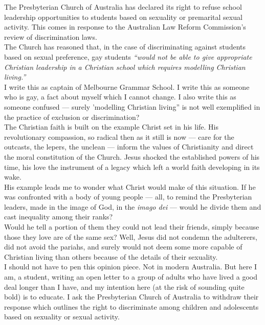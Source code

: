\documentclass[a4paper]{article}
\begin{document}
The Presbyterian Church of Australia has declared its right to refuse school leadership opportunities to students based on sexuality or premarital sexual activity. This comes in response to the Australian Law Reform Commission’s review of discrimination laws.\\

The Church has reasoned that, in the case of discriminating against students based on sexual preference, gay students \textit{``would not be able to give appropriate Christian leadership in a Christian school which requires modelling Christian living.''}\\

I write this as captain of Melbourne Grammar School. I write this as someone who is gay, a fact about myself which I cannot change. I also write this as someone confused — surely 'modelling Christian living” is not well exemplified in the practice of exclusion or discrimination?\\

The Christian faith is built on the example Christ set in his life. His revolutionary compassion, so radical then as it still is now — care for the outcasts, the lepers, the unclean — inform the values of Christianity and direct the moral constitution of the Church. Jesus shocked the established powers of his time, his love the instrument of a legacy which left a world faith developing in its wake.\\

His example leads me to wonder what Christ would make of this situation. If he was confronted with a body of young people — all, to remind the Presbyterian leaders, made in the image of God, in the \textit{imago dei} — would he divide them and cast inequality among their ranks?\\

Would he tell a portion of them they could not lead their friends, simply because those they love are of the same sex? Well, Jesus did not condemn the adulterers, did not avoid the pariahs, and surely would not deem some more capable of Christian living than others because of the details of their sexuality.\\

I should not have to pen this opinion piece. Not in modern Australia. But here I am, a student, writing an open letter to a group of adults who have lived a good deal longer than I have, and my intention here (at the risk of sounding quite bold) is to educate. I ask the Presbyterian Church of Australia to withdraw their response which outlines the right to discriminate among children and adolescents based on sexuality or sexual activity.\\
\end{document}
